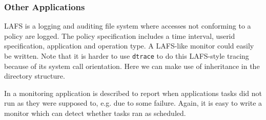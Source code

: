\subsubsection{Other Applications}

LAFS \cite{wee1995lafs}
is a logging and auditing file system where accesses not conforming
to a policy are logged.
The policy specification
includes a time interval, userid specification, application
and operation type. A LAFS-like monitor could easily be written.
Note that it is harder to use {\tt dtrace} to do this LAFS-style tracing 
because of its system call orientation. Here we can make use of 
inheritance in the directory structure. 

In \cite{finke2002process} a monitoring application is described to report when 
applications tasks did not run as they were supposed to, e.g. due to some
failure. Again, it is easy to write a monitor which can detect whether
tasks ran as scheduled.

